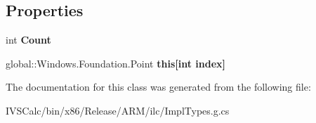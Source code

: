 \subsection*{Properties}
\begin{DoxyCompactItemize}
\item 
\mbox{\label{class_system_1_1_collections_1_1_generic_1_1_i_read_only_list___a___windows___foundation___pointf8b8009c5a56ca9e6410026ae080e8ed_a038ad908a10dd8143a56f817db984c67}} 
int {\bfseries Count}
\item 
\mbox{\label{class_system_1_1_collections_1_1_generic_1_1_i_read_only_list___a___windows___foundation___pointf8b8009c5a56ca9e6410026ae080e8ed_a8dfd10eb009db9e7aeee0bce592e13c4}} 
global\+::\+Windows.\+Foundation.\+Point {\bfseries this\mbox{[}int index\mbox{]}}
\end{DoxyCompactItemize}


The documentation for this class was generated from the following file\+:\begin{DoxyCompactItemize}
\item 
I\+V\+S\+Calc/bin/x86/\+Release/\+A\+R\+M/ilc/Impl\+Types.\+g.\+cs\end{DoxyCompactItemize}
